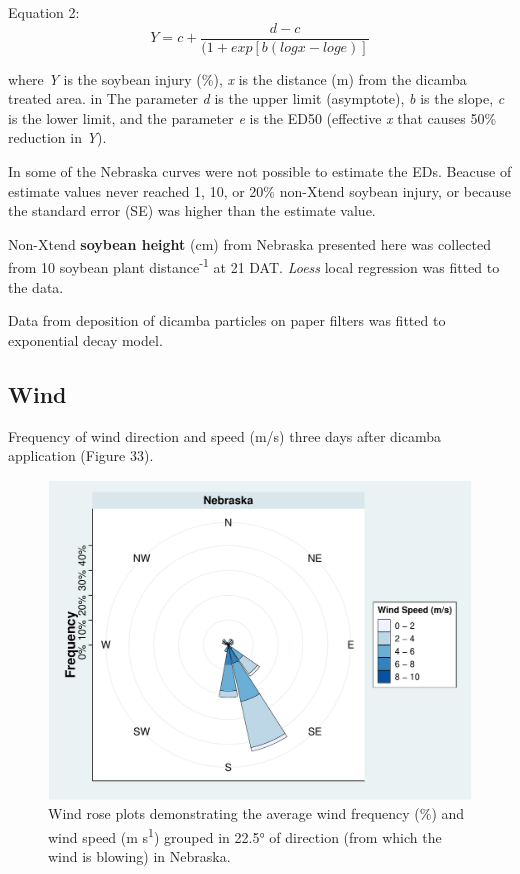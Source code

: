 \documentclass[]{article}
\begin{document}
Equation 2: \[Y= c + \frac{d - c}{(1 + exp[b(logx - loge)]} \]

where \emph{Y} is the soybean injury (\%), \emph{x} is the distance (m)
from the dicamba treated area. in The parameter \emph{d} is the upper
limit (asymptote), \emph{b} is the slope, \emph{c} is the lower limit,
and the parameter \emph{e} is the ED50 (effective \emph{x} that causes
50\% reduction in \emph{Y}).

In some of the Nebraska curves were not possible to estimate the EDs.
Beacuse of estimate values never reached 1, 10, or 20\% non-Xtend
soybean injury, or because the standard error (SE) was higher than the
estimate value.

Non-Xtend \textbf{soybean height} (cm) from Nebraska presented here was
collected from 10 soybean plant distance\textsuperscript{-1} at 21 DAT.
\emph{Loess} local regression was fitted to the data.

Data from deposition of dicamba particles on paper filters was fitted to
exponential decay model.

\pagebreak
\newpage

\pagebreak
\newpage

\subsection{Wind}\label{wind-3}

Frequency of wind direction and speed (m/s) three days after dicamba
application (Figure 33).

\begin{figure}
\centering
\includegraphics{Report_files/figure-latex/unnamed-chunk-70-1.pdf}
\caption{Wind rose plots demonstrating the average wind frequency (\%)
and wind speed (m s\textsuperscript{1}) grouped in 22.5° of direction
(from which the wind is blowing) in Nebraska.}
\end{figure}
\end{document}
